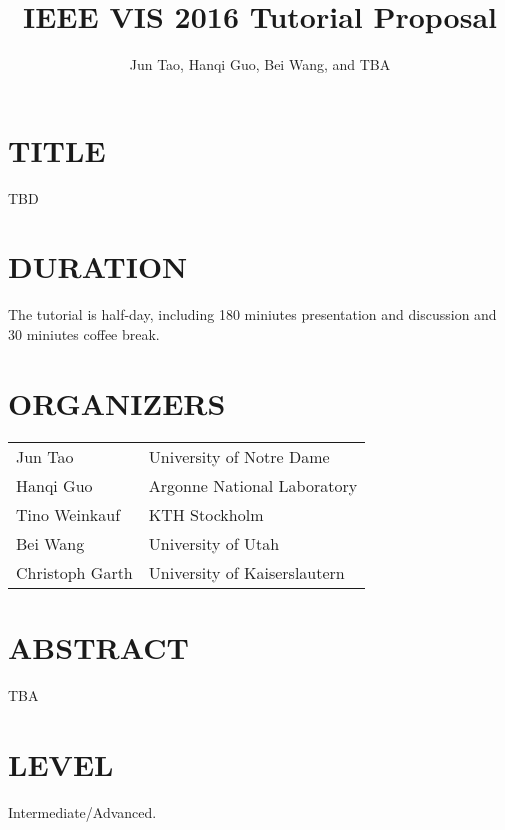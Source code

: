\documentclass[preprint,journal]{vgtc}       %
\title{IEEE VIS 2016 Tutorial Proposal}
\author{Jun Tao, Hanqi Guo, Bei Wang, and TBA}
\begin{document}


\maketitle

\section*{TITLE}
TBD

\section*{DURATION}
The tutorial is half-day, including 180 miniutes presentation and discussion and 30 miniutes coffee break.

\section*{ORGANIZERS}

\vspace{-0.1in}
\begin{table}[H]
\begin{tabular}{ll}
Jun Tao & University of Notre Dame\\
Hanqi Guo & Argonne National Laboratory\\
Tino Weinkauf & KTH Stockholm\\
Bei Wang & University of Utah\\
Christoph Garth & University of Kaiserslautern
\end{tabular}
\end{table}

\section*{ABSTRACT}
TBA

\section*{LEVEL}
Intermediate/Advanced.
\end{document}
